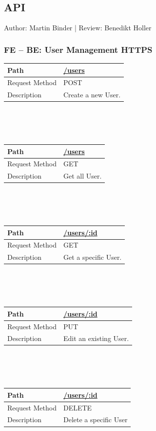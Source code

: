 \documentclass{scrreprt}
\begin{document}
\subsection{API}
\label{api}
Author: Martin Binder | Review: Benedikt Holler
\subsubsection{FE -- BE: User Management HTTPS}
\begin{tabularx}{12cm}{l|l}
	Path & \url{/users} \\\hline
	Request Method & POST \\\hline
	Description & Create a new User.
\end{tabularx}
\\
\\ \\
\begin{tabularx}{12cm}{l|l}
	Path & \url{/users} \\\hline
	Request Method & GET \\\hline
	Description & Get all User.
\end{tabularx}
\\
\\ \\
\begin{tabularx}{12cm}{l|l}
	Path & \url{/users/:id} \\\hline
	Request Method & GET \\\hline
	Description & Get a specific User.
\end{tabularx}
\\
\\ \\
\begin{tabularx}{12cm}{l|l}
	Path & \url{/users/:id} \\\hline
	Request Method & PUT  \\\hline
	Description & Edit an existing User.
\end{tabularx}
\\
\\ \\
\begin{tabularx}{12cm}{l|l}
	Path & \url{/users/:id} \\\hline
	Request Method & DELETE \\\hline
	Description & Delete a specific User
\end{tabularx}
\\
\\ \\
\end{document}
